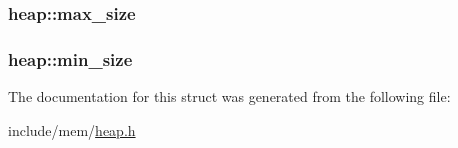 \subsubsection[{max\+\_\+size}]{ heap\+::max\+\_\+size}\label{structheap_ad2e0262828735d6e437facbfce37d6b0}
\hypertarget{structheap_a7b4422774c5ca7ac8ed5ddfe95f5c8ec}{}
\subsubsection[{min\+\_\+size}]{ heap\+::min\+\_\+size}\label{structheap_a7b4422774c5ca7ac8ed5ddfe95f5c8ec}


The documentation for this struct was generated from the following file\+:\begin{DoxyCompactItemize}
\item 
include/mem/\hyperlink{heap_8h}{heap.\+h}\end{DoxyCompactItemize}
